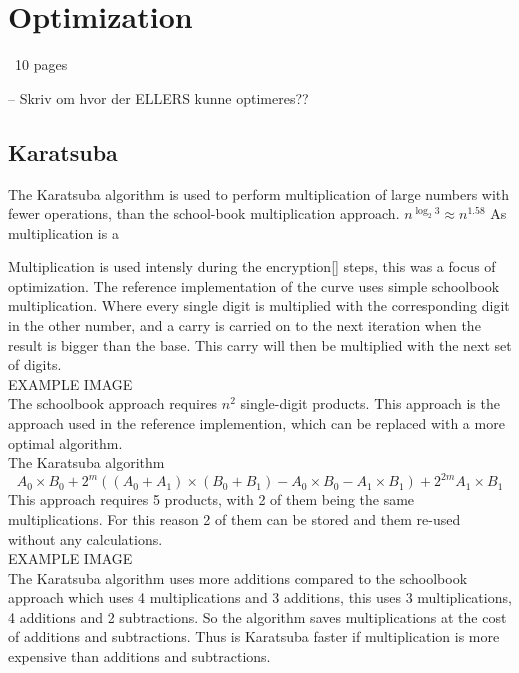 \section{Optimization}
~10 pages


-- Skriv om hvor der ELLERS kunne optimeres??


\subsection{Karatsuba}
The Karatsuba algorithm is used to perform multiplication of large numbers with fewer operations, than the school-book multiplication approach.
$n^{\log_{2}3} \approx n^{1.58}$
As multiplication is a 

Multiplication is used intensly during the encryption[] steps, this was a focus of optimization. The reference implementation of the curve uses simple schoolbook multiplication.
Where every single digit is multiplied with the corresponding digit in the other number, and a carry is carried on to the next iteration when the result is bigger than the base. This carry will then be multiplied with the next set of digits.\\
EXAMPLE IMAGE\\
The schoolbook approach requires $n^{2}$ single-digit products. 
This approach is the approach used in the reference implemention, which can be replaced with a more optimal algorithm.
\\

The Karatsuba algorithm 
\label{karat-opti}
\[A_0 \times B_0 + 2^{m}((A_0 + A_1) \times (B_0 + B_1) - A_0 \times B_0 - A_1 \times B_1) + 2^{2m} A_1 \times B_1\]
This approach requires 5 products, with 2 of them being the same multiplications. For this reason 2 of them can be stored and them re-used without any calculations.
\\EXAMPLE IMAGE\\
The Karatsuba algorithm uses more additions compared to the schoolbook approach which uses 4 multiplications and 3 additions, this uses 3 multiplications, 4 additions and 2 subtractions. So the algorithm saves multiplications at the cost of additions and subtractions. Thus is Karatsuba faster if multiplication is more expensive than additions and subtractions. 

